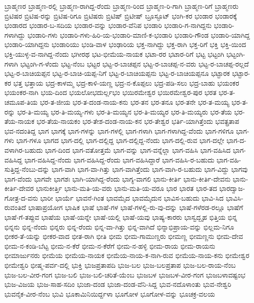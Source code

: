 {ಬ್ರಾಹ್ಮಣರ
ಬ್ರಾಹ್ಮಣ-ರಲ್ಲಿ
ಬ್ರಾಹ್ಮಣ-ರಾಗಿದ್ದ-ರೆಂದು
ಬ್ರಾಹ್ಮಣ-ರಿಂದ
ಬ್ರಾಹ್ಮಣ-ರಿ-ಗಾಗಿ
ಬ್ರಾಹ್ಮಣ-ರಿಗೆ
ಬ್ರಾಹ್ಮಣರು
ಬ್ರಿಟಿಷರ
ಬ್ರಿಟಿಷ-ರನ್ನು
ಬ್ರಿಟಿಷ-ರಿಗೂ
ಬ್ರಿಟಿಷರು
ಬ್ರಿಟಿಷ್
ಬ್ರಿಟೀಷ್
ಬ್ರೂಸ್ಫೂಟ್
ಭಂಗಿ-ಕರ
ಭಂಡಾರ
ಭಂಡಾರಕ್ಕೆ
ಭಂಡಾರದ
ಭಂಡಾರ-ಬ-ಸದಿಯ
ಭಂಡಾರ-ವನ್ನು
ಭಂಡಾರ-ವೆನಿಪ
ಭಂಡಾರಿ
ಭಂಡಾರಿ-ಗ-ನಾಗಿದ್ದನು
ಭಂಡಾರಿ-ಗಳಾಗಿದ್ದು
ಭಂಡಾರಿ-ಗಳು
ಭಂಡಾರಿ-ಗಳು-ಹಿರಿ-ಯ-ಭಂಡಾರಿ-ಮಾಣಿ-ಕ-ಭಂಡಾರಿ
ಭಂಡಾರಿ-ಗೌಂಡ
ಭಂಡಾರಿ-ಯಾಗಿದ್ದ
ಭಂಡಾರಿ-ಯಾಗಿದ್ದನು
ಭಂಡಾರಿಯು
ಭಂಡಿ-ವಾಳ
ಭಂಢಾರಿಯ
ಭಕ್ತ-ನಾಗಿದ್ದು
ಭಕ್ತ-ರಾಗಿ
ಭಕ್ತ-ರಿಗೆ
ಭಕ್ತಿ
ಭಕ್ತಿ-ಯಿಂದ
ಭಕ್ತಿ-ಯುಳ್ಳ-ವ-ನಾಗಿದ್ದ-ನೆಂದು
ಭಗೀರಥ
ಭಟ-ಭೀಮೆಯ-ನಾಯಕ
ಭಟಾ-ರರ
ಭಟಾರ-ರಿಗೆ
ಭಟ್ಟ
ಭಟ್ಟಂಗಿ
ಭಟ್ಟಂಗಿ-ಗಳಾಗಿ
ಭಟ್ಟಂಗಿ-ಗ-ಳೆಂದು
ಭಟ್ಟ-ನೆಂಬ
ಭಟ್ಟರ
ಭಟ್ಟ-ರ-ಬಾಚಪ್ಪನ
ಭಟ್ಟ-ರ-ಬಾಚಪ್ಪ-ನ-ವರು
ಭಟ್ಟ-ರ-ಬಾಚಪ್ಪ-ರಲ್ಲದೆ
ಭಟ್ಟ-ರ-ಬಾಚಿಯಪ್ಪನ
ಭಟ್ಟ-ರ-ಬಾಚಿ-ಯಪ್ಪ-ನಿಗೆ
ಭಟ್ಟ-ರ-ಬಾಚಿಯಪ್ಪನು
ಭಟ್ಟ-ರ-ಬಾಚಿಯಪ್ಪನೂ
ಭಟ್ಟಾರಕ
ಭಟ್ಟಾರ-ಕರ
ಭತ್ತ
ಭತ್ತಾಯ
ಭದ್ರ-ಕಾಳಮ್ಮ
ಭದ್ರ-ಕಾಳಿ-ಯಣ್ಣ
ಭದ್ರ-ನ-ಕೊಪ್ಪಲು
ಭದ್ರ-ಪಡಿ-ಸಲು
ಭದ್ರ-ಬಾಹು
ಭಯಂಕರ
ಭಯಂಕರ-ನಾಗಿ
ಭಯ-ದಿಂದ
ಭಯಲೋಭದುರ್ಲ್ಲಭಂ
ಭಯಿರಮೇಶ್ವರ
ಭಯಿರಮೇಶ್ವರ-ಪುರ
ಭರತ
ಭರ-ತ-ಚಮೂಪ-ತಿಯ
ಭರ-ತ-ಜೀಯ
ಭರ-ತ-ದಂಡ-ನಾಯ-ಕನು
ಭರ-ತನ
ಭರ-ತನೂ
ಭರ-ತನೇ
ಭರ-ತ-ಮಯ್ಯ
ಭರ-ತ-ರನ್ನು
ಭರ-ತಿ-ಮಯ್ಯ
ಭರ-ತಿ-ಮಯ್ಯ-ಗಳು
ಭರ-ತಿ-ಮಯ್ಯನ
ಭರ-ತಿ-ಮಯ್ಯರ
ಭರ-ತಿ-ಮಯ್ಯರು
ಭರ-ತೆಯ
ಭರ-ತೆಯ-ನಾಯಕ
ಭರ-ತೆಯ-ನಾಯಕಂ
ಭರ-ತೇಶ-ದಂಡ-ನಾಯ-ಕನ
ಭರ-ತೇಶ್ವರ
ಭರ್ತಿ-ಯಾಗಿತ್ತೆಂದು
ಭವತ್ಪ್ರತಾಪ
ಭವ-ನದಂತಿದ್ದ
ಭಾಗ
ಭಾಗಕ್ಕೆ
ಭಾಗ-ಗಳನ್ನು
ಭಾಗ-ಗಳಲ್ಲಿ
ಭಾಗ-ಗಳಾಗಿ
ಭಾಗ-ಗಳಾಗಿದ್ದ-ವೆಂದು
ಭಾಗ-ಗಳಿಗೂ
ಭಾಗ-ಗಳು
ಭಾಗ-ಗಳೂ
ಭಾಗದ
ಭಾಗ-ದಲ್ಲಿ
ಭಾಗ-ದಲ್ಲಿದ್ದ
ಭಾಗ-ದಲ್ಲಿದ್ದ-ನೆಂದು
ಭಾಗ-ದಲ್ಲಿ-ರುವ
ಭಾಗ-ದಲ್ಲೇ
ಭಾಗ-ದ-ವಳಾಗಿರ-ಬಹುದು
ಭಾಗ-ದಿಂದ
ಭಾಗ-ವತೋತ್ತಮೆ
ಭಾಗ-ವನ್ನು
ಭಾಗ-ವನ್ನೆಲ್ಲಾ
ಭಾಗ-ವಹಿಸಿ
ಭಾಗ-ವಹಿಸಿದ
ಭಾಗ-ವಹಿಸಿದ್ದ
ಭಾಗ-ವಹಿಸಿದ್ದ-ನೆಂದು
ಭಾಗ-ವಹಿಸಿದ್ದ-ರೆಂದು
ಭಾಗ-ವಹಿಸಿದ್ದಾರೆ
ಭಾಗ-ವಹಿಸಿ-ರ-ಬಹುದು
ಭಾಗ-ವಹಿ-ಸುತ್ತಿದ್ದ-ನೆಂಬು-ದನ್ನು
ಭಾಗ-ವಾಗಿ
ಭಾಗ-ವಾ-ಗಿತ್ತು
ಭಾಗ-ವಾಗಿತ್ತೆಂದು
ಭಾಗ-ವಾಗಿ-ರ-ಬಹುದು
ಭಾಗ-ವಿದ್ದು
ಭಾಗವು
ಭಾಗ-ವೆಂದು
ಭಾಗವೇ
ಭಾಗಶಃ
ಭಾಗಿ-ಯಾಗಿದ್ದ-ರೆಂದು
ಭಾಗ್ಯ-ವಾಗಲಿ
ಭಾನು-ಕೀರ್ತಿ
ಭಾನು-ಕೀರ್ತಿ-ದೇವನು
ಭಾನು-ಕೀರ್ತಿ-ದೇವರ
ಭಾನುಕೀರ್ತ್ತಿ
ಭಾನು-ಮತಿ-ಯ-ವರು
ಭಾನು-ಮತಿ-ಯ-ವರೂ
ಭಾರ
ಭಾರತ
ಭಾರ-ತದ
ಭಾರದ್ವಾಜ-ಗೋತ್ರ-ದ-ವನು
ಭಾರೀ
ಭಾರ್ಯೆ
ಭಾವನೆ-ಗಿಂತ
ಭಾವಮೈದ
ಭಾವಮೈದುನ
ಭಾವಿಸ-ಬಹುದು
ಭಾವಿ-ಸಿದ
ಭಾವಿಸಿ-ರುವಂತಿದೆ
ಭಾಷಾಪ್ರಯೋಗ
ಭಾಷಿಕ
ಭಾಷೆ
ಭಾಷೆ-ಗಳ
ಭಾಷೆ-ಗಳಲ್ಲಿ-ರು-ವು-ದನ್ನು
ಭಾಷೆ-ಗಳೆರಡ-ರಲ್ಲೂ
ಭಾಷೆಗೆ
ಭಾಷೆ-ಗೆ-ತಪ್ಪುವ
ಭಾಷೆಯ
ಭಾಷೆ-ಯನ್ನೇ
ಭಾಷೆ-ಯಲ್ಲಿ
ಭಾಷೆ-ಯವು
ಭಾಷ್ಯ-ಕಾರರು
ಭಾಸ್ವದ್ಬೃಹ
ಭಿತ್ತಿಯ
ಭಿನ್ನ
ಭಿನ್ನನು
ಭಿನ್ನ-ನೆಂದು
ಭಿನ್ನರು
ಭಿನ್ನ-ರೆಂದು
ಭಿನ್ನ-ವಾ-ಗಿತ್ತು
ಭಿನ್ನ-ವಾಗಿದೆ
ಭಿನ್ನಾಭಿಪ್ರಾಯ-ವನ್ನು
ಭಿಲ್ಲಮ-ನಿಗೂ
ಭೀಕರ-ತೆ-ಯನ್ನು
ಭೀಕರ-ವಾದ
ಭೀತ-ರಾಗಿ
ಭೀತಿ
ಭೀಮ
ಭೀಮ-ಗಾಮುಣ್ಡರು
ಭೀಮಣ್ಣ
ಭೀಮಣ್ಣನು
ಭೀಮ-ದೇವ
ಭೀಮ-ನ-ಕಂಡಿ-ಬೆಟ್ಟ
ಭೀಮ-ನ-ಕೆರೆ
ಭೀಮ-ನ-ಕೆರೆಗೆ
ಭೀಮ-ನ-ಹಳ್ಳಿ
ಭೀಮ-ರಾಯ
ಭೀಮ-ರಾಯನು
ಭೀಮಾರ್ಜುನರು
ಭೀಮೆಯ
ಭೀಮೆಯ-ನಾಯಕ
ಭೀಮೆಯ-ನಾಯ-ಕ-ನಾಗಿ-ರುವ
ಭೀಮೆಯ-ನಾಯ-ಕನು
ಭೀಮೇಶ್ವರ
ಭೀಮೇಶ್ವರಿ
ಭೀಷ್ಮ-ಪರ್ವ-ದಲ್ಲಿ
ಭುಕ್ತಿ
ಭುಜಪ್ರತಾಪದಿ
ಭುಜ-ಬಲ
ಭುಜ-ಬಲಪ್ರತಾಪ
ಭುಜ-ಬಲ-ರಾಯ-ನೆಂಬ
ಭುಜ-ಬಲ-ವೀರ-ಗಂಗ
ಭುಜ-ಬಲಿ
ಭುಜ-ಬಲಿ-ಚರಿತೆ-ಯೆಂಬ
ಭುಜಬಳ
ಭುಜಬಳ-ವೀರ-ಗಂಗ
ಭುಜಬಳಾವಷ್ಟಂಭ
ಭುಜ-ವಿಜಯ
ಭುಜ-ಸಾಹ-ಸದಿಂ
ಭುಜಾ-ದಂಡ
ಭುಜಾ-ದಂಡ-ವೆನಿ-ಸಿದ್ದ
ಭುವ-ನದೊಳಾಂತು
ಭುವ-ನೇಶ್ವರಿ
ಭುವನೈಕ-ವೀರ-ನೆಂಬ
ಭುವಿ
ಭೂಕಾಮಿನಿಯಿರ್ದ್ದಳಾ
ಭೂಗೋಳ
ಭೂಗೋಳ-ವನ್ನು
ಭೂಚಕ್ರ-ವಲಯ
}
